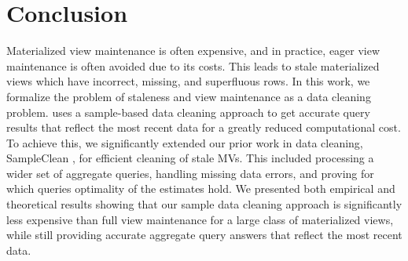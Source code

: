 \section{Conclusion}\label{conclusion}
\vspace{-.3em}
Materialized view maintenance is often expensive, and in practice, eager view maintenance is often avoided due to its costs.
This leads to stale materialized views which have incorrect, missing, and superfluous rows.
In this work, we formalize the problem of staleness and view maintenance as a data cleaning problem.
\svc uses a sample-based data cleaning approach to get accurate query results that reflect the most recent data for a greatly reduced computational cost.
To achieve this, we significantly extended our prior work in data cleaning, SampleClean \cite{wang1999sample}, for efficient cleaning of stale MVs. 
This included processing a wider set of aggregate queries, handling missing data errors, and proving for which queries optimality of the estimates hold.
We presented both empirical and theoretical results showing that our sample data cleaning approach is significantly less expensive than full view maintenance for a large class of materialized views, while still providing accurate aggregate query answers that reflect the most recent data.





